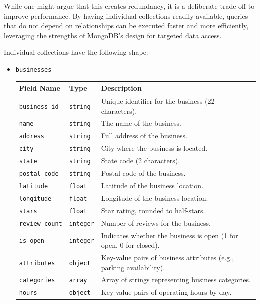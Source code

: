 \documentclass{Configuration_Files/PoliMi3i_thesis}
\begin{document}
While one might argue that this creates redundancy, it is a deliberate trade-off to improve performance. By having individual collections readily available, queries that do not depend on relationships can be executed faster and more efficiently, leveraging the strengths of MongoDB's design for targeted data access.

Individual collections have the following shape:
\begin{itemize}

\item{\texttt{businesses}}
\begin{longtable}{|p{3cm}|p{2.5cm}|p{10cm}|}
\hline
\textbf{Field Name} & \textbf{Type} & \textbf{Description} \\ \hline
\texttt{business\_id} & \texttt{string} & Unique identifier for the business (22 characters). \\ \hline
\texttt{name} & \texttt{string} & The name of the business. \\ \hline
\texttt{address} & \texttt{string} & Full address of the business. \\ \hline
\texttt{city} & \texttt{string} & City where the business is located. \\ \hline
\texttt{state} & \texttt{string} & State code (2 characters). \\ \hline
\texttt{postal\_code} & \texttt{string} & Postal code of the business. \\ \hline
\texttt{latitude} & \texttt{float} & Latitude of the business location. \\ \hline
\texttt{longitude} & \texttt{float} & Longitude of the business location. \\ \hline
\texttt{stars} & \texttt{float} & Star rating, rounded to half-stars. \\ \hline
\texttt{review\_count} & \texttt{integer} & Number of reviews for the business. \\ \hline
\texttt{is\_open} & \texttt{integer} & Indicates whether the business is open (1 for open, 0 for closed). \\ \hline
\texttt{attributes} & \texttt{object} & Key-value pairs of business attributes (e.g., parking availability). \\ \hline
\texttt{categories} & \texttt{array} & Array of strings representing business categories. \\ \hline
\texttt{hours} & \texttt{object} & Key-value pairs of operating hours by day. \\ \hline
\end{longtable}


\end{itemize}
\end{document}

